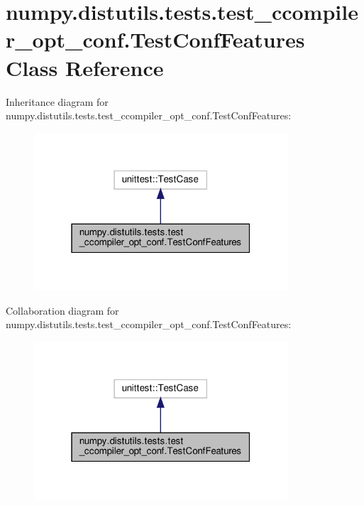 \hypertarget{classnumpy_1_1distutils_1_1tests_1_1test__ccompiler__opt__conf_1_1TestConfFeatures}{}\section{numpy.\+distutils.\+tests.\+test\+\_\+ccompiler\+\_\+opt\+\_\+conf.\+Test\+Conf\+Features Class Reference}
\label{classnumpy_1_1distutils_1_1tests_1_1test__ccompiler__opt__conf_1_1TestConfFeatures}


Inheritance diagram for numpy.\+distutils.\+tests.\+test\+\_\+ccompiler\+\_\+opt\+\_\+conf.\+Test\+Conf\+Features\+:
\nopagebreak
\begin{figure}[H]
\begin{center}
\leavevmode
\includegraphics[width=268pt]{classnumpy_1_1distutils_1_1tests_1_1test__ccompiler__opt__conf_1_1TestConfFeatures__inherit__graph}
\end{center}
\end{figure}


Collaboration diagram for numpy.\+distutils.\+tests.\+test\+\_\+ccompiler\+\_\+opt\+\_\+conf.\+Test\+Conf\+Features\+:
\nopagebreak
\begin{figure}[H]
\begin{center}
\leavevmode
\includegraphics[width=268pt]{classnumpy_1_1distutils_1_1tests_1_1test__ccompiler__opt__conf_1_1TestConfFeatures__coll__graph}
\end{center}
\end{figure}
